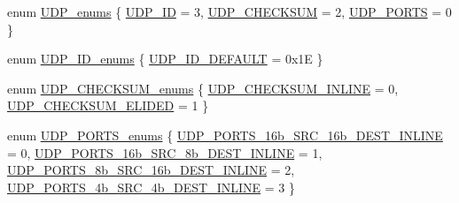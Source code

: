 \begin{DoxyCompactItemize}
\item 
enum \hyperlink{group___open_udp_ga90595692081cf39cd0ab9d42716d4357}{U\+D\+P\+\_\+enums} \{ \hyperlink{group___open_udp_gga90595692081cf39cd0ab9d42716d4357afe6291d4aed5acbe7fd687ac6ffd5850}{U\+D\+P\+\_\+\+ID} = 3, 
\hyperlink{group___open_udp_gga90595692081cf39cd0ab9d42716d4357a023f62c28dc0309eefd1041049ef87b1}{U\+D\+P\+\_\+\+C\+H\+E\+C\+K\+S\+UM} = 2, 
\hyperlink{group___open_udp_gga90595692081cf39cd0ab9d42716d4357ab67fc05e1ebad5885b7b2c6c6ddd20ee}{U\+D\+P\+\_\+\+P\+O\+R\+TS} = 0
 \}
\item 
enum \hyperlink{group___open_udp_ga2930e96d6b2f1b8c7c38e6743e795a60}{U\+D\+P\+\_\+\+I\+D\+\_\+enums} \{ \hyperlink{group___open_udp_gga2930e96d6b2f1b8c7c38e6743e795a60ac75f32f33cd13e01c40f8c1d6a86dd05}{U\+D\+P\+\_\+\+I\+D\+\_\+\+D\+E\+F\+A\+U\+LT} = 0x1E
 \}
\item 
enum \hyperlink{group___open_udp_ga21a554bc52e07e6f7be2bc4417fc28f3}{U\+D\+P\+\_\+\+C\+H\+E\+C\+K\+S\+U\+M\+\_\+enums} \{ \hyperlink{group___open_udp_gga21a554bc52e07e6f7be2bc4417fc28f3afbf2e2e31a7a1a23bf7d126b07d43a5e}{U\+D\+P\+\_\+\+C\+H\+E\+C\+K\+S\+U\+M\+\_\+\+I\+N\+L\+I\+NE} = 0, 
\hyperlink{group___open_udp_gga21a554bc52e07e6f7be2bc4417fc28f3a17e25d12efc84c8e084143c678b26ab6}{U\+D\+P\+\_\+\+C\+H\+E\+C\+K\+S\+U\+M\+\_\+\+E\+L\+I\+D\+ED} = 1
 \}
\item 
enum \hyperlink{group___open_udp_gacb60c38958e033a846340c32e8921dd6}{U\+D\+P\+\_\+\+P\+O\+R\+T\+S\+\_\+enums} \{ \hyperlink{group___open_udp_ggacb60c38958e033a846340c32e8921dd6a724a4a9e52d59b7f61a6d730f3f611e3}{U\+D\+P\+\_\+\+P\+O\+R\+T\+S\+\_\+16b\+\_\+\+S\+R\+C\+\_\+16b\+\_\+\+D\+E\+S\+T\+\_\+\+I\+N\+L\+I\+NE} = 0, 
\hyperlink{group___open_udp_ggacb60c38958e033a846340c32e8921dd6ab683c349dc91f91498b56f26c2e65d70}{U\+D\+P\+\_\+\+P\+O\+R\+T\+S\+\_\+16b\+\_\+\+S\+R\+C\+\_\+8b\+\_\+\+D\+E\+S\+T\+\_\+\+I\+N\+L\+I\+NE} = 1, 
\hyperlink{group___open_udp_ggacb60c38958e033a846340c32e8921dd6a70f324d04f019706e25a6a0bc409afc5}{U\+D\+P\+\_\+\+P\+O\+R\+T\+S\+\_\+8b\+\_\+\+S\+R\+C\+\_\+16b\+\_\+\+D\+E\+S\+T\+\_\+\+I\+N\+L\+I\+NE} = 2, 
\hyperlink{group___open_udp_ggacb60c38958e033a846340c32e8921dd6a999c5336cb433d4bb2f503dac77534a1}{U\+D\+P\+\_\+\+P\+O\+R\+T\+S\+\_\+4b\+\_\+\+S\+R\+C\+\_\+4b\+\_\+\+D\+E\+S\+T\+\_\+\+I\+N\+L\+I\+NE} = 3
 \}
\end{DoxyCompactItemize}
